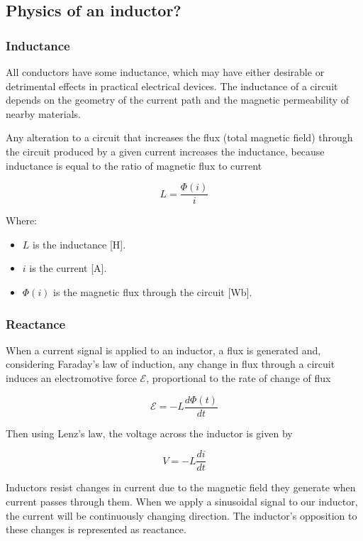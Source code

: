 \subsection{Physics of an inductor?}

\subsubsection{Inductance}
All conductors have some inductance, which may have either desirable or detrimental effects in practical electrical devices. The inductance of a circuit depends on the geometry of the current path and the magnetic permeability of nearby materials.

Any alteration to a circuit that increases the flux (total magnetic field) through the circuit produced by a given current increases the inductance, because inductance is equal to the ratio of magnetic flux to current

\begin{equation}
    L = \frac{\Phi(i)}{i} \label{eq: Inductance_&_flux}
\end{equation}

Where:
\begin{itemize}
    \item $L$ is the inductance [H].
    \item $i$ is the current [A].
    \item $\Phi(i)$ is the magnetic flux through the circuit [Wb].
\end{itemize}    

\subsubsection{Reactance}
When a current signal is applied to an inductor, a flux is generated and, considering Faraday's law of induction, any change in flux through a circuit induces an electromotive force ${\mathcal {E}}$, proportional to the rate of change of flux

\begin{equation}
    {\mathcal {E}} = -L \frac{d\Phi(t)}{dt}
\end{equation}

Then using Lenz's law, the voltage across the inductor is given by

\begin{equation}
    V = -L \frac{di}{dt}
\end{equation}

Inductors resist changes in current due to the magnetic field they generate when current passes through them. When we apply a sinusoidal signal to our inductor, the current will be continuously changing direction. The inductor's opposition to these changes is represented as reactance.

